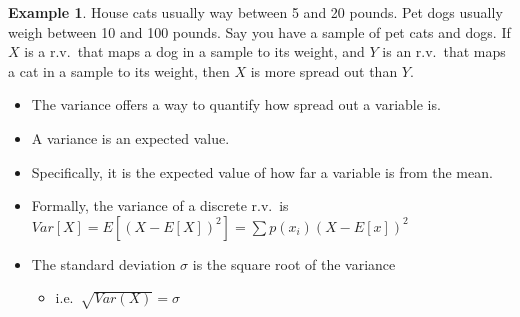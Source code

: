 \documentclass[]{article}
\theoremstyle{definition}
\newtheorem{exmp}{Example}[section]
\begin{document}
\begin{exmp}
House cats usually way between 5 and 20 pounds. Pet dogs usually weigh between 10 and 100 pounds. Say you have a sample of pet cats and dogs. If $X$ is a r.v.\ that maps a dog in a sample to its weight, and $Y$ is an r.v.\ that maps a cat in a sample to its weight, then $X$ is more spread out than $Y$.
\end{exmp} 

\begin{itemize}
\item The variance offers a way to quantify how spread out a variable is. 
\item A variance is an expected value. 
\item Specifically, it is the expected value of how far a variable is from the mean.
\item Formally, the variance of a discrete r.v.\ is $Var[X]=E[(X - E[X])^2] = \sum p(x_i) (X - E[x])^2$
\item The standard deviation $\sigma$ is the square root of the variance
	\begin{itemize}
	\item[] i.e.\ $\sqrt{Var(X)}=\sigma$
 	\end{itemize}
\end{itemize}
\end{document}
